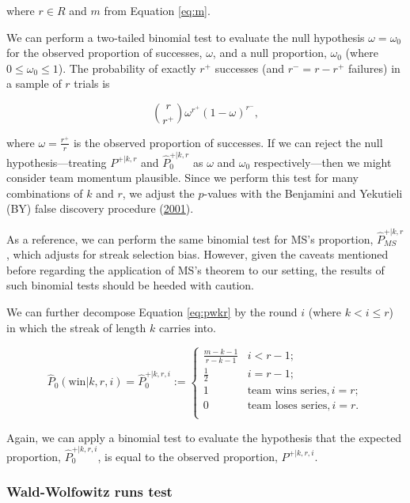 \documentclass{article}
\begin{document}
where \(r \in R\) and \(m\) from Equation \ref{eq:m}.

We can perform a two-tailed binomial test to evaluate the null
hypothesis \(\omega = \omega_0\) for the observed proportion of
successes, \(\omega\), and a null proportion, \(\omega_0\) (where
\(0 \leq \omega_0 \leq 1\)). The probability of exactly \(r^+\)
successes (and \(r^- = r - r^+\) failures) in a sample of \(r\) trials
is

\begin{equation}\label{eq:binom}
\binom {r}{r^+} \omega^{r^+}(1-\omega)^{r^-},
\end{equation}

where \(\omega = \frac{r^+}{r}\) is the observed proportion of
successes. If we can reject the null hypothesis---treating \(P^{+|k,r}\)
and \(\hat{P}^{+|k,r}_0\) as \(\omega\) and \(\omega_0\)
respectively---then we might consider team momentum plausible. Since we
perform this test for many combinations of \(k\) and \(r\), we adjust
the \(p\)-values with the Benjamini and Yekutieli (BY) false discovery
procedure (\protect\hyperlink{ref-benjamini2001}{2001}).

As a reference, we can perform the same binomial test for MS's
proportion, \(\hat{P}^{+|k,r}_{MS}\), which adjusts for streak selection
bias. However, given the caveats mentioned before regarding the
application of MS's theorem to our setting, the results of such binomial
tests should be heeded with caution.

We can further decompose Equation \ref{eq:pwkr} by the round \(i\)
(where \(k < i \leq r\)) in which the streak of length \(k\) carries
into.

\begin{equation}\label{eq:pwkri}
\hat{P}_0(\text{win} | k, r, i) = \hat{P}^{+|k,r,i}_0 := \begin{cases}
\frac{m-k-1}{r-k-1} & i < r-1; \\
\frac{1}{2} & i = r-1; \\
1 & \text{team wins series}, i = r; \\
0 & \text{team loses series}, i = r. \\
\end{cases}
\end{equation}

Again, we can apply a binomial test to evaluate the hypothesis that the
expected proportion, \(\hat{P}^{+|k,r,i}_0\), is equal to the observed
proportion, \(P^{+|k,r,i}\).

\hypertarget{wald-wolfowitz-runs-test}{%
\subsubsection{Wald-Wolfowitz runs
test}\label{wald-wolfowitz-runs-test}}
\end{document}
